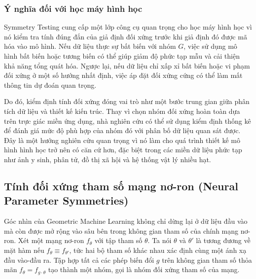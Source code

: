 \subsubsection{Ý nghĩa đối với học máy hình học}

Symmetry Testing cung cấp một lớp công cụ quan trọng cho học máy hình học vì nó kiểm tra tính đúng đắn của giả định đối xứng trước khi giả định đó được mã hóa vào mô hình. Nếu dữ liệu thực sự bất biến với nhóm $G$, việc sử dụng mô hình bất biến hoặc tương biến có thể giúp giảm độ phức tạp mẫu và cải thiện khả năng tổng quát hóa. Ngược lại, nếu dữ liệu chỉ xấp xỉ bất biến hoặc vi phạm đối xứng ở một số hướng nhất định, việc áp đặt đối xứng cứng có thể làm mất thông tin dự đoán quan trọng.

Do đó, kiểm định tính đối xứng đóng vai trò như một bước trung gian giữa phân tích dữ liệu và thiết kế kiến trúc. Thay vì chọn nhóm đối xứng hoàn toàn dựa trên trực giác miền ứng dụng, nhà nghiên cứu có thể sử dụng kiểm định thống kê để đánh giá mức độ phù hợp của nhóm đó với phân bố dữ liệu quan sát được. Đây là một hướng nghiên cứu quan trọng vì nó làm cho quá trình thiết kế mô hình hình học trở nên có căn cứ hơn, đặc biệt trong các miền dữ liệu phức tạp như ảnh y sinh, phân tử, đồ thị xã hội và hệ thống vật lý nhiều hạt.



\subsection{Tính đối xứng tham số mạng nơ-ron (Neural Parameter Symmetries)}
\label{subsec:parameter-symmetries}


Góc nhìn của Geometric Machine Learning không chỉ dừng lại ở dữ liệu đầu vào mà còn được mở rộng vào sâu bên trong không gian tham số của chính mạng nơ-ron. Xét một mạng nơ-ron $f_\theta$ với tập tham số $\theta$. Ta nói $\theta$ và $\theta'$ là tương đương về mặt hàm nếu $f_\theta \equiv f_{\theta'}$, tức hai bộ tham số khác nhau xác định cùng một ánh xạ đầu vào-đầu ra. Tập hợp tất cả các phép biến đổi $g$ trên không gian tham số thỏa mãn $f_\theta = f_{g \cdot \theta}$ tạo thành một nhóm, gọi là nhóm đối xứng tham số  của mạng.

